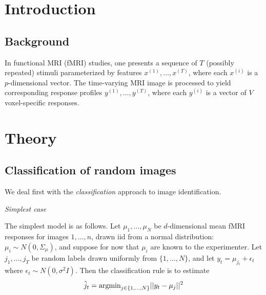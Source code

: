 \documentclass[11pt]{article}
\begin{document}
\section{Introduction}

\subsection{Background}

In functional MRI (fMRI) studies, one presents a sequence of $T$
(possibly repeated) stimuli parameterized by features $x^{(1)},
\hdots, x^{(T)}$, where each $x^{(i)}$ is a $p$-dimensional vector.
The time-varying MRI image is processed to yield corresponding
response profiles $y^{(1)}, \hdots, y^{(T)}$, where each $y^{(i)}$ is
a vector of $V$ voxel-specific responses.  

\section{Theory}

\subsection{Classification of random images}

We deal first with the \emph{classification} approach to image
identification.

\noindent\emph{Simplest case}

The simplest model is as follows.  Let $\mu_1,\hdots, \mu_N$ be
$d$-dimensional mean fMRI responses for images $1,\hdots, n$, drawn
iid from a normal distribution: $\mu_i \sim N(0, \Sigma_\mu)$, and
suppose for now that $\mu_i$ are known to the experimenter.  Let
$j_1,\hdots, j_T$ be random labels drawn uniformly from $\{1,\hdots,
N\}$, and let $y_t = \mu_{j_t} + \epsilon_t$ where $\epsilon_t \sim
N(0, \sigma^2 I)$.  Then the classification rule is to estimate
\[
\hat{j}_t = \text{argmin}_{j \in \{1, \hdots, N\}} ||y_t - \mu_j||^2
\]
\end{document}
